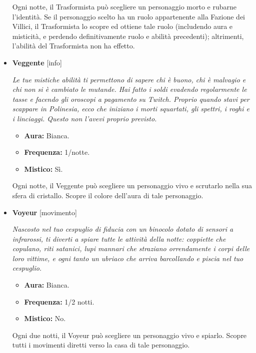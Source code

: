 \documentclass[a4paper,10pt]{article}
\begin{document}
\begin{itemize}
            Ogni notte, il Trasformista può scegliere un personaggio morto e rubarne l'identità. Se il personaggio scelto ha un ruolo appartenente alla Fazione dei Villici, il Trasformista lo scopre ed ottiene tale ruolo (includendo aura e misticità, e perdendo definitivamente ruolo e abilità precedenti); altrimenti, l'abilità del Trasformista non ha effetto.

      \item \textbf{Veggente} [info]

            \emph{Le tue mistiche abilità ti permettono di sapere chi è buono, chi è malvagio e chi non si è cambiato le mutande. Hai fatto i soldi evadendo regolarmente le tasse e facendo gli oroscopi a pagamento su Twitch. Proprio quando stavi per scappare in Polinesia, ecco che iniziano i morti squartati, gli spettri, i roghi e i linciaggi. Questo non l'avevi proprio previsto.}

            \begin{multicols}{3}
                  \begin{itemize}
                        \item \textbf{Aura:} Bianca.
                        \item \textbf{Frequenza:} 1/notte.
                        \item \textbf{Mistico:} Sì.
                  \end{itemize}
            \end{multicols}

            Ogni notte, il Veggente può scegliere un personaggio vivo e scrutarlo nella sua sfera di cristallo. Scopre il colore dell'aura di tale personaggio.

      \item \textbf{Voyeur} [movimento]

            \emph{Nascosto nel tuo cespuglio di fiducia con un binocolo dotato di sensori a infrarossi, ti diverti a spiare tutte le attività della notte: coppiette che copulano, riti satanici, lupi mannari che straziano orrendamente i corpi delle loro vittime, e ogni tanto un ubriaco che arriva barcollando e piscia nel tuo cespuglio.}

            \begin{multicols}{3}
                  \begin{itemize}
                        \item \textbf{Aura:} Bianca.
                        \item \textbf{Frequenza:} 1/2 notti.
                        \item \textbf{Mistico:} No.
                  \end{itemize}
            \end{multicols}

            Ogni due notti, il Voyeur può scegliere un personaggio vivo e spiarlo. Scopre tutti i movimenti diretti verso la casa di tale personaggio.

\end{itemize}
\end{document}
